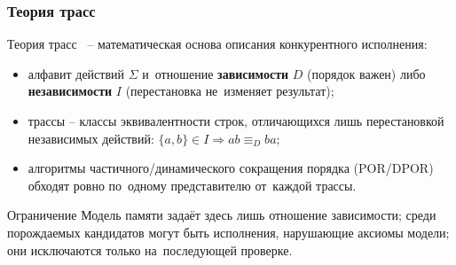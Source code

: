 \begin{frame}
  \frametitle{Теория трасс}
  Теория трасс~\cite{mazurkiewicz1986trace} -- математическая основа
  описания конкурентного
  исполнения:
  \begin{itemize}
    \item алфавит действий $\Sigma$ и~отношение \textbf{зависимости}
      $D$ (порядок важен) либо \textbf{независимости}
      $I$ (перестановка не~изменяет результат);
    \item трассы -- классы эквивалентности строк, отличающихся лишь
      перестановкой независимых действий: $\{a, b\} \in I
      \Rightarrow ab \equiv_D ba$;
    \item алгоритмы частичного/динамического сокращения порядка
      (POR/DPOR)~\cite{flanagan2005dynamic,chockler2018computer}
      обходят ровно по~одному представителю от~каждой трассы.
  \end{itemize}
  \begin{alertblock}{Ограничение}
    Модель памяти задаёт здесь лишь отношение зависимости; среди
    порождаемых кандидатов могут быть исполнения, нарушающие аксиомы
    модели; они исключаются только на~последующей проверке.
  \end{alertblock}

\end{frame}

